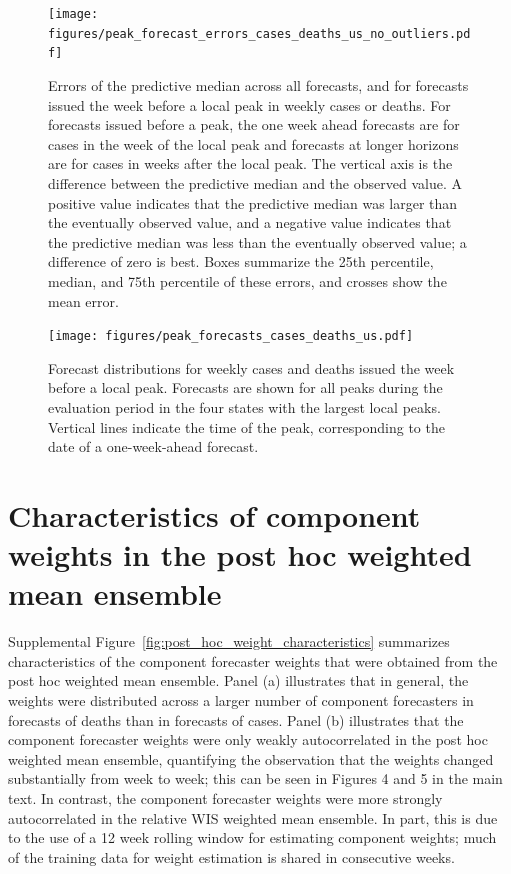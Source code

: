 \documentclass{article}
\begin{document}
\begin{figure}[H]
  \texttt{[image: figures/peak\_forecast\_errors\_cases\_deaths\_us\_no\_outliers.pdf]}
  \caption{Errors of the predictive median across all forecasts, and for forecasts issued the week before a local peak in weekly cases or deaths. For forecasts issued before a peak, the one week ahead forecasts are for cases in the week of the local peak and forecasts at longer horizons are for cases in weeks after the local peak. The vertical axis is the difference between the predictive median and the observed value. A positive value indicates that the predictive median was larger than the eventually observed value, and a negative value indicates that the predictive median was less than the eventually observed value; a difference of zero is best. Boxes summarize the 25th percentile, median, and 75th percentile of these errors, and crosses show the mean error.}
  \label{fig:peak_case_death_forecast_errors_by_horizon_central_only}
\end{figure}

\begin{figure}
  \texttt{[image: figures/peak\_forecasts\_cases\_deaths\_us.pdf]}
  \caption{Forecast distributions for weekly cases and deaths issued the week before a local peak. Forecasts are shown for all peaks during the evaluation period in the four states with the largest local peaks. Vertical lines indicate the time of the peak, corresponding to the date of a one-week-ahead forecast.}
  \label{fig:peak_case_death_forecast_examples}
\end{figure}

\newpage

\section{Characteristics of component weights in the post hoc weighted mean ensemble}

Supplemental Figure~\ref{fig:post_hoc_weight_characteristics} summarizes characteristics of the component forecaster weights that were obtained from the post hoc weighted mean ensemble. Panel (a) illustrates that in general, the weights were distributed across a larger number of component forecasters in forecasts of deaths than in forecasts of cases. Panel (b) illustrates that the component forecaster weights were only weakly autocorrelated in the post hoc weighted mean ensemble, quantifying the observation that the weights changed substantially from week to week; this can be seen in Figures 4 and 5 in the main text. In contrast, the component forecaster weights were more strongly autocorrelated in the relative WIS weighted mean ensemble. In part, this is due to the use of a 12 week rolling window for estimating component weights; much of the training data for weight estimation is shared in consecutive weeks.
\end{document}
